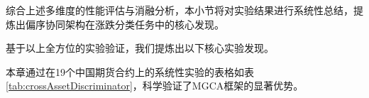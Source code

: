 

综合上述多维度的性能评估与消融分析，本小节将对实验结果进行系统性总结，提炼出偏序协同架构在涨跌分类任务中的核心发现。


基于以上全方位的实验验证，我们提炼出以下核心实验发现。


本章通过在19个中国期货合约上的系统性实验的表格如表\ref{tab:crossAssetDiscriminator}，科学验证了MGCA框架的显著优势。

